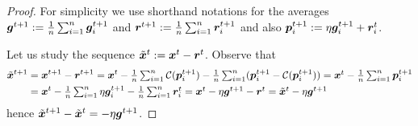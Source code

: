 \documentclass{article}
\begin{document}
\begin{proof}
  For simplicity we use shorthand notations for the averages $\bm{g}^{t+1} := \tfrac{1}{n} \textstyle\sum_{i=1}^n \bm{g}_i^{t+1}$ and $\bm r^{t+1} := \tfrac{1}{n} \textstyle\sum_{i=1}^n \bm r_i^{t+1}$ and also $\bm{p}_i^{t+1} := \eta \bm{g}_i^{t+1} + \bm r_i^t$.
  
  Let us study the sequence $\tilde {\bm{x}}^t := \bm{x}^t - \bm r^t$. Observe that
  \begin{align*}
    \tilde {\bm{x}}^{t+1}
     & =
    \bm{x}^{t+1} - \bm r^{t+1}
    =
    \bm{x}^t - \tfrac{1}{n} \textstyle\sum_{i=1}^n \mathcal C(\bm{p}_i^{t+1}) - \tfrac{1}{n} \textstyle\sum_{i=1}^n (\bm{p}_i^{t+1} - \mathcal C(\bm{p}_i^{t+1}))
    =
    \bm{x}^t - \tfrac{1}{n} \textstyle\sum_{i=1}^n \bm{p}_i^{t+1}
    \\
     & =
    \bm{x}^t -  \tfrac{1}{n} \textstyle\sum_{i=1}^n \eta \bm{g}_i^{t+1} - \tfrac{1}{n} \textstyle\sum_{i=1}^n \bm r_i^t
    =
    \bm{x}^t - \eta \bm{g}^{t+1} - \bm r^t
    =
    \tilde {\bm{x}}^t - \eta \bm{g}^{t+1}
  \end{align*}
  hence $\tilde {\bm{x}}^{t+1} - \tilde {\bm{x}}^t = -\eta \bm{g}^{t+1}$. 


\end{proof}
\end{document}
